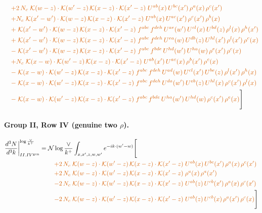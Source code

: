 \documentclass[10pt]{article}
\numberwithin{equation}{section}
\newcommand{\NNv}{\mathcal N\log\frac{\vee}{k^+}}
\begin{document}
\begin{align}
&\quad{\color{BFK}+2\,N_c\;\mathcal{K}(w-z)\cdot\mathcal{K}(w'-z)\,\mathcal{K}(x-z)\cdot\mathcal{K}(x'-z)\;U^{ab}(x)\,U^{bc}(x')\,\rho^{a}(x)\,\rho^{c}(x')}\notag\\
&\quad{\color{BFK}+N_c\;\mathcal{K}(x'-w')\cdot\mathcal{K}(w-z)\,\mathcal{K}(x-z)\cdot\mathcal{K}(x'-z)\;U^{ab}(x)\,U^{ac}(x')\,\rho^{c}(x')\,\rho^{b}(x)}\notag\\
&\quad{\color{BFK}+\;\mathcal{K}(x'-w')\cdot\mathcal{K}(w-z)\,\mathcal{K}(x-z)\cdot\mathcal{K}(x'-z)\;f^{abc}\,f^{deh}\,U^{ae}(w')\,U^{cl}(x)\,U^{bd}(z)\,\rho^{l}(x)\,\rho^{h}(x')}\notag\\
&\quad{\color{BFK}+\;\mathcal{K}(x'-w')\cdot\mathcal{K}(w-z)\,\mathcal{K}(x-z)\cdot\mathcal{K}(x'-z)\;f^{abc}\,f^{deh}\,U^{ea}(w)\,U^{db}(z)\,U^{hl}(x')\,\rho^{l}(x')\,\rho^{c}(x)}\notag\\
&\quad{\color{BFK}-\;\mathcal{K}(x'-w')\cdot\mathcal{K}(w-z)\,\mathcal{K}(x-z)\cdot\mathcal{K}(x'-z)\;f^{abc}\,f^{bde}\,U^{hd}(w')\,U^{ha}(w)\,\rho^{e}(x')\,\rho^{c}(x)}\notag\\
&\quad{\color{BFK}+N_c\;\mathcal{K}(x-w)\cdot\mathcal{K}(w'-z)\,\mathcal{K}(x-z)\cdot\mathcal{K}(x'-z)\;U^{ab}(x')\,U^{ac}(x)\,\rho^{b}(x')\,\rho^{c}(x)}\notag\\
&\quad{\color{BFK}-\;\mathcal{K}(x-w)\cdot\mathcal{K}(w'-z)\,\mathcal{K}(x-z)\cdot\mathcal{K}(x'-z)\;f^{abc}\,f^{deh}\,U^{ad}(w)\,U^{cl}(x')\,U^{be}(z)\,\rho^{l}(x')\,\rho^{h}(x)}\notag\\
&\quad{\color{BFK}-\;\mathcal{K}(x-w)\cdot\mathcal{K}(w'-z)\,\mathcal{K}(x-z)\cdot\mathcal{K}(x'-z)\;f^{abc}\,f^{deh}\,U^{da}(w')\,U^{eb}(z)\,U^{hl}(x)\,\rho^{c}(x')\,\rho^{l}(x)}\notag\\
&\quad{\color{BFK}-\;\mathcal{K}(x-w)\cdot\mathcal{K}(w'-z)\,\mathcal{K}(x-z)\cdot\mathcal{K}(x'-z)\;f^{abc}\,f^{bde}\,U^{ha}(w')\,U^{hd}(w)\,\rho^{c}(x')\,\rho^{e}(x)}\Bigg]\label{eq:P9}
\end{align}
\paragraph{Group II, Row IV (genuine two $\rho$).}
\begin{align}
\frac{d^3N}{d^3k}\bigg|^{\log\frac{\vee}{k^+}}_{II.IV^{\rm gen}}={}&\NNv\int_{x,x',z,w,w'}e^{-ik\cdot(w'-w)}\Bigg[\notag\\
&\quad{\color{BFK}+2\,N_c\;\mathcal{K}(w-z)\cdot\mathcal{K}(w'-z)\,\mathcal{K}(x-z)\cdot\mathcal{K}(x'-z)\;U^{ab}(x)\,U^{bc}(x')\,\rho^{a}(x)\,\rho^{c}(x')}\notag\\
&\quad{\color{BFK}+2\,N_c\;\mathcal{K}(w-z)\cdot\mathcal{K}(w'-z)\,\mathcal{K}(x-z)\cdot\mathcal{K}(x'-z)\;\rho^{a}(x)\,\rho^{a}(x')}\notag\\
&\quad{\color{BFK}-2\,N_c\;\mathcal{K}(w-z)\cdot\mathcal{K}(w'-z)\,\mathcal{K}(x-z)\cdot\mathcal{K}(x'-z)\;U^{ab}(z)\,U^{cb}(x')\,\rho^{a}(x)\,\rho^{c}(x')}\notag\\
&\quad{\color{BFK}-2\,N_c\;\mathcal{K}(w-z)\cdot\mathcal{K}(w'-z)\,\mathcal{K}(x-z)\cdot\mathcal{K}(x'-z)\;U^{ab}(z)\,U^{cb}(x)\,\rho^{a}(x')\,\rho^{c}(x)}\Bigg]\label{eq:P10}
\end{align}
\end{document}
